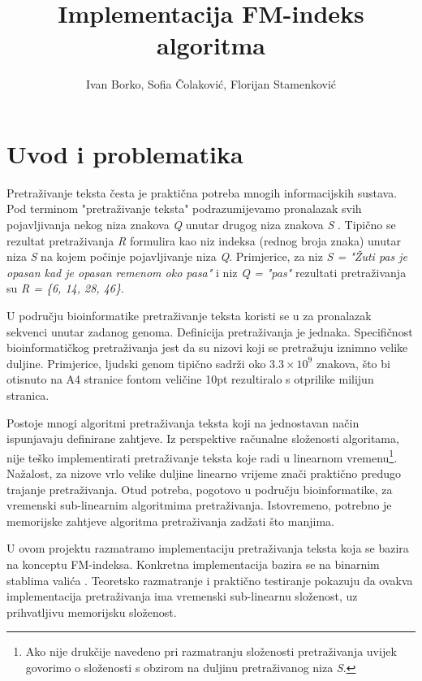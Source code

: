 \documentclass[times, utf8, seminar, numeric]{fer}
\title{Implementacija FM-indeks algoritma}
\author{Ivan Borko, Sofia Čolaković, Florijan Stamenković}
\begin{document}
\maketitle

\tableofcontents

\chapter{Uvod i problematika}

Pretraživanje teksta česta je praktična potreba mnogih informacijskih sustava.
Pod terminom "pretraživanje teksta" podrazumijevamo pronalazak svih pojavljivanja
nekog niza znakova \textit{Q}  unutar drugog niza znakova \textit{S} .
Tipično se rezultat pretraživanja \textit{R}
formulira kao niz indeksa (rednog broja znaka) unutar niza \textit{S} na kojem počinje pojavljivanje
niza \textit{Q}. Primjerice, za niz \textit{S = "Žuti pas je opasan kad je opasan remenom oko pasa"}
i niz \textit{Q = "pas"} rezultati
pretraživanja su \textit{R = \{6, 14, 28, 46\}}.

U području bioinformatike pretraživanje teksta koristi se u za pronalazak
sekvenci unutar zadanog genoma. Definicija pretraživanja je jednaka. Specifičnost
bioinformatičkog pretraživanja jest da su nizovi koji se pretražuju iznimno velike duljine.
Primjerice, ljudski genom tipično sadrži oko $3.3 \times 10^9$ znakova, što bi otisnuto na
A4 stranice fontom veličine 10pt rezultiralo s otprilike milijun stranica.

Postoje mnogi algoritmi pretraživanja teksta
koji na jednostavan način ispunjavaju definirane zahtjeve.
Iz perspektive računalne složenosti algoritama, nije teško implementirati pretraživanje
teksta koje radi u linearnom vremenu\footnote{Ako nije drukčije navedeno pri razmatranju složenosti pretraživanja
uvijek govorimo o složenosti s obzirom na duljinu pretraživanog niza \textit{S}.}.
Nažalost, za nizove vrlo velike duljine linearno vrijeme
znači praktično predugo trajanje pretraživanja. Otud potreba, pogotovo u području bioinformatike,
za vremenski sub-linearnim algoritmima pretraživanja. Istovremeno, potrebno je memorijske
zahtjeve algoritma pretraživanja zadžati što manjima.

U ovom projektu razmatramo implementaciju pretraživanja teksta koja se bazira na konceptu
FM-indeksa. Konkretna implementacija bazira se na binarnim stablima valića .
Teoretsko razmatranje i praktično testiranje pokazuju da ovakva implementacija pretraživanja
ima vremenski sub-linearnu složenost, uz prihvatljivu memorijsku složenost.
\end{document}
